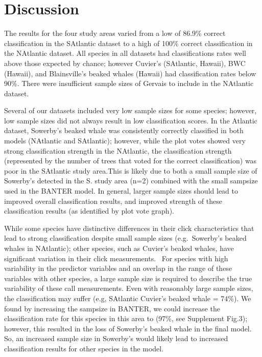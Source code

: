 \documentclass[
  authoryear,
  preprint,
  3p]{elsarticle}
\begin{document}
\hypertarget{discussion}{%
\section{Discussion}\label{discussion}}

The results for the four study areas varied from a low of 86.9\% correct
classification in the SAtlantic dataset to a high of 100\% correct
classification in the NAtlantic dataset. All species in all datasets had
classifications rates well above those expected by chance; however
Cuvier's (SAtlantic, Hawaii), BWC (Hawaii), and Blainsville's beaked
whales (Hawaii) had classification rates below 90\%. There were
insufficient sample sizes of Gervais to include in the NAtlantic
dataset.

Several of our datasets included very low sample sizes for some species;
however, low sample sizes did not always result in low classification
scores. In the Atlantic dataset, Sowerby's beaked whale was consistently
correctly classified in both models (NAtlantic and SAtlantic); however,
while the plot votes showed very strong classification strength in the
NAtlantic, the classification strength (represented by the number of
trees that voted for the correct classification) was poor in the
SAtlantic study area.This is likely due to both a small sample size of
Sowerby's detected in the S. study area (n=2) combined with the small
sampsize used in the BANTER model. In general, larger sample sizes
should lead to improved overall classification results, and improved
strength of these classification results (as identified by plot vote
graph).

While some species have distinctive differences in their click
characteristics that lead to strong classification despite small sample
sizes (e.g.~Sowerby's beaked whales in NAtlantic); other species, such
as Cuvier's beaked whales, have significant variation in their click
measurements. ~For species with high variability in the predictor
variables and an overlap in the range of these variables with other
species, a large sample size is required to describe the true
variability of these call measurements. Even with reasonably large
sample sizes, the classification may suffer (e.g, SAtlantic Cuvier's
beaked whale = 74\%). We found by increasing the sampsize in BANTER, we
could increase the classification rate for this species in this area to
(97\%, see Supplement Fig.3); however, this resulted in the loss of
Sowerby's beaked whale in the final model. So, an increased sample size
in Sowerby's would likely lead to increased classification results for
other species in the model.
\end{document}
